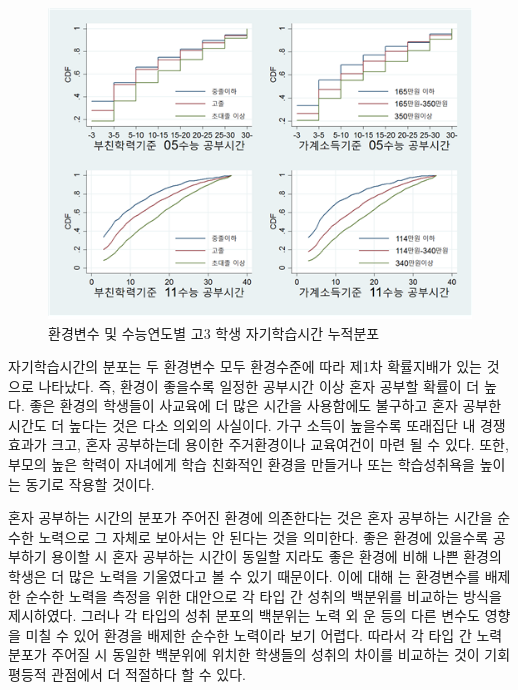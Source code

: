 \begin{figure}
    \centering
    \includegraphics[width=140mm]{figure/knk_cdf_studytime.png}
    \caption{환경변수 및 수능연도별 고3 학생 자기학습시간 누적분포}
    \label{fig:knk_cdf_study}
\end{figure}

자기학습시간의 분포는 두 환경변수 모두 환경수준에 따라 제1차 확률지배가 있는 것으로 나타났다.
즉, 환경이 좋을수록 일정한 공부시간 이상 혼자 공부할 확률이 더 높다.
 좋은 환경의 학생들이 사교육에 더 많은 시간을 사용함에도 불구하고 혼자 공부한 시간도 더 높다는 것은 다소 의외의 사실이다.
 가구 소득이 높을수록 또래집단 내 경쟁효과가 크고, 혼자 공부하는데 용이한 주거환경이나 교육여건이 마련 될 수 있다.
 또한, 부모의 높은 학력이 자녀에게 학습 친화적인 환경을 만들거나 또는 학습성취욕을 높이는 동기로 작용할  것이다.

혼자 공부하는 시간의 분포가 주어진 환경에 의존한다는 것은 혼자 공부하는 시간을 순수한 노력으로 그 자체로 보아서는 안 된다는 것을 의미한다.
 좋은 환경에 있을수록 공부하기 용이할 시 혼자 공부하는 시간이 동일할 지라도 좋은 환경에 비해 나쁜 환경의 학생은 더 많은 노력을 기울였다고 볼 수 있기 때문이다.
 이에 대해 \cite{Roemer98}는 환경변수를 배제한 순수한 노력을 측정을 위한 대안으로 각 타입 간 성취의 백분위를 비교하는 방식을 제시하였다.
 그러나 각 타입의 성취 분포의 백분위는 노력 외 운 등의 다른 변수도 영향을 미칠 수 있어 환경을 배제한 순수한 노력이라 보기 어렵다.
 따라서 각 타입 간 노력 분포가 주어질 시 동일한 백분위에 위치한 학생들의 성취의 차이를 비교하는 것이 기회 평등적 관점에서 더 적절하다 할 수 있다.



